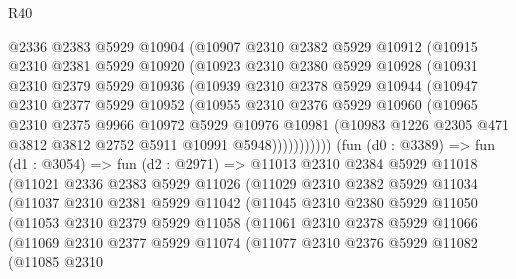 \begin{lexlean}{R40}
\begin{coremodule}
            @2336
            @2383
            @5929
            @10904
            (@10907
              @2310
              @2382
              @5929
              @10912
              (@10915
                @2310
                @2381
                @5929
                @10920
                (@10923
                  @2310
                  @2380
                  @5929
                  @10928
                  (@10931
                    @2310
                    @2379
                    @5929
                    @10936
                    (@10939
                      @2310
                      @2378
                      @5929
                      @10944
                      (@10947
                        @2310
                        @2377
                        @5929
                        @10952
                        (@10955
                          @2310
                          @2376
                          @5929
                          @10960
                          (@10965
                            @2310
                            @2375
                            @9966
                            @10972
                            @5929
                            @10976
                            @10981
                            (@10983 @1226 @2305 @471 @3812 @3812 @2752 @5911 @10991 @5948)))))))))))
        (fun (d0 : @3389) =>
        fun (d1 : @3054) =>
        fun (d2 : @2971) =>
        @11013
          @2310
          @2384
          @5929
          @11018
          (@11021
            @2336
            @2383
            @5929
            @11026
            (@11029
              @2310
              @2382
              @5929
              @11034
              (@11037
                @2310
                @2381
                @5929
                @11042
                (@11045
                  @2310
                  @2380
                  @5929
                  @11050
                  (@11053
                    @2310
                    @2379
                    @5929
                    @11058
                    (@11061
                      @2310
                      @2378
                      @5929
                      @11066
                      (@11069
                        @2310
                        @2377
                        @5929
                        @11074
                        (@11077
                          @2310
                          @2376
                          @5929
                          @11082
                          (@11085
                            @2310

\end{coremodule}
\end{lexlean}
